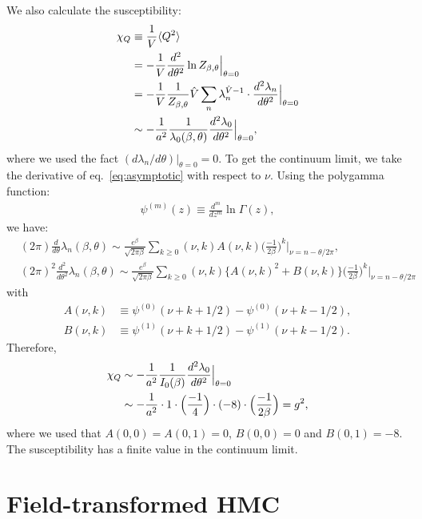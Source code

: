 \documentclass[12pt]{article}
\begin{document}
We also calculate the susceptibility:
\begin{align}
  \chi_Q
  & \equiv {1\over V} \langle Q^2 \rangle \nonumber\\
  &=
    -{ 1\over V} \frac{d^2}{d\theta^2} \ln Z_{\beta,\theta}\Big|_{\theta=0}
    \nonumber\\
  &= -{ 1\over V} \frac{1}{Z_{\beta,\theta}} \hat{V}
    \sum_n \lambda_n^{\hat{V}-1} \cdot \frac{d^2\lambda_n}{d\theta^2}\Big|_{\theta=0} \nonumber\\
  &\sim
    -{ 1\over a^2}
    {1\over\lambda_0(\beta,\theta)}
    \frac{d^2\lambda_0}{d\theta^2}
    \Big|_{\theta=0},
\end{align}
where we used the fact $(d\lambda_n/d\theta) |_{\theta=0} = 0$.
To get the continuum limit, we take
the derivative of eq.~\eqref{eq:asymptotic} with respect to $\nu$.
Using the polygamma function:
\begin{align}
  \psi^{(m)}(z) \equiv \frac{d^m}{dz^m} \ln \Gamma(z),
\end{align}
we have:
\begin{align}
  &(2\pi)\frac{d}{d\theta}\lambda_n(\beta,\theta)
    \sim
    \frac{e^\beta}{\sqrt{2\pi \beta}} \sum_{k\geq 0}
    (\nu,k) A(\nu,k)
    \Big(\frac{-1}{2\beta}\Big)^k
    \Big|_{\nu=n-\theta/2\pi}, \\
  &(2\pi)^2\frac{d^2}{d\theta^2}\lambda_n(\beta,\theta)
    \sim
    \frac{e^\beta}{\sqrt{2\pi \beta}} \sum_{k\geq 0}
    (\nu,k)
    \big\{
    A(\nu,k)^2 + B(\nu,k)
    \big\}
    \Big(\frac{-1}{2\beta}\Big)^k
    \Big|_{\nu=n-\theta/2\pi}
\end{align}
with
\begin{align}
  A(\nu, k) &\equiv \psi^{(0)}(\nu+k+1/2)-\psi^{(0)}(\nu+k-1/2), \\
  B(\nu, k) &\equiv \psi^{(1)}(\nu+k+1/2)-\psi^{(1)}(\nu+k-1/2).
\end{align}
Therefore,
\begin{align}
  \chi_Q
  &\sim
  -{ 1\over a^2}
  {1\over I_0(\beta)}
  \frac{d^2\lambda_0}{d\theta^2}
    \Big|_{\theta=0} \nonumber\\
  &\sim
    -{ 1\over a^2} \cdot 1 \cdot
    \Big({-1\over 4}\Big)\cdot (-8) \cdot \Big({-1\over 2\beta}\Big)
    =g^2,
\end{align}
where we used that $A(0,0)=A(0,1)=0$, $B(0,0)=0$ and $B(0,1)=-8$.
The susceptibility has a finite value in the continuum limit.



\section{Field-transformed HMC}
\label{sec:ft-hmc}
\end{document}
